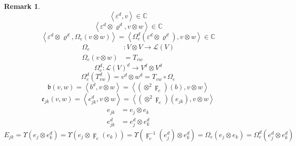 \documentclass[aps,preprint]{revtex4}%
\newtheorem{remark}[theorem]{Remark}
\begin{document}
\begin{remark}%
\begin{equation}
\left\langle \varepsilon^{d},v\right\rangle \in\mathbb{C}%
\end{equation}%
\begin{equation}
\left\langle \varepsilon^{d}\otimes\varrho^{d},v\otimes w\right\rangle
\in\mathbb{C}%
\end{equation}%
\begin{equation}
\left\langle \varepsilon^{d}\otimes\varrho^{d},\Omega_{e}\left(  v\otimes
w\right)  \right\rangle =\left\langle \Omega_{e}^{d}\left(  \varepsilon
^{d}\otimes\varrho^{d}\right)  ,v\otimes w\right\rangle \in\mathbb{C}%
\end{equation}%
\begin{align}
\Omega_{e}  &  :V\otimes V\rightarrow\mathcal{L}\left(  V\right) \\
\Omega_{e}\left(  v\otimes w\right)   &  =T_{vw}%
\end{align}%
\begin{equation}
\Omega_{e}^{d}:\mathcal{L}\left(  V\right)  ^{d}\rightarrow V^{d}\otimes V^{d}%
\end{equation}%
\begin{equation}
\Omega_{e}^{d}\left(  T_{vw}^{d}\right)  =v^{d}\otimes w^{d}=T_{vw}\circ
\Omega_{e}%
\end{equation}%
\begin{equation}
\mathfrak{b}\left(  v,w\right)  =\left\langle b^{d},v\otimes w\right\rangle
=\left\langle \left(  \otimes^{2}\digamma_{e}\right)  \left(  b\right)
,v\otimes w\right\rangle
\end{equation}%
\begin{equation}
\mathfrak{e}_{jk}\left(  v,w\right)  =\left\langle e_{jk}^{d},v\otimes
w\right\rangle =\left\langle \left(  \otimes^{2}\digamma_{e}\right)  \left(
e_{jk}\right)  ,v\otimes w\right\rangle
\end{equation}%
\begin{align}
e_{jk}  &  =e_{j}\otimes e_{k}\\
e_{jk}^{d}  &  =e_{j}^{d}\otimes e_{k}^{d}%
\end{align}%
\begin{equation}
E_{jk}=\Upsilon\left(  e_{j}\otimes e_{k}^{d}\right)  =\Upsilon\left(
e_{j}\otimes\digamma_{e}\left(  e_{k}\right)  \right)  =\Upsilon\left(
\digamma_{e}^{-1}\left(  e_{j}^{d}\right)  \otimes e_{k}^{d}\right)
=\Omega_{e}\left(  e_{j}\otimes e_{k}\right)  =\Omega_{e}^{d}\left(  e_{j}%
^{d}\otimes e_{k}^{d}\right)
\end{equation}

\end{remark}
\end{document}
